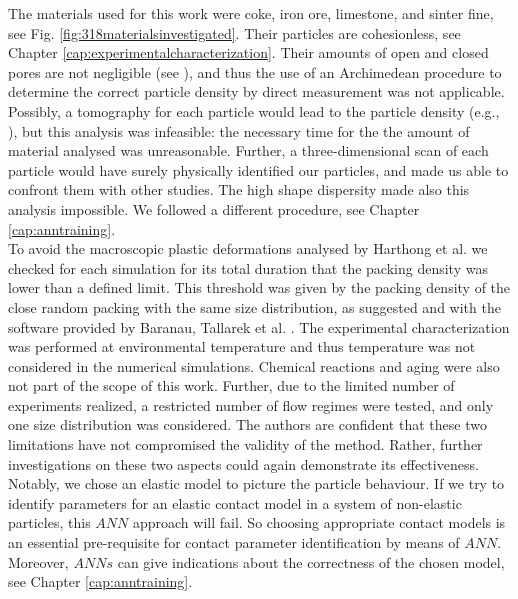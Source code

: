 The materials used for this work were coke, iron ore, limestone, and sinter
fine, see Fig. \ref{fig:318materialsinvestigated}. 
Their particles are
cohesionless, see Chapter \ref{cap:experimentalcharacterization}.
Their amounts of open and closed pores are not negligible (see
\citet{RefWorks:191}), 
and thus the use of an Archimedean procedure to determine the correct particle density by direct measurement
was not applicable.
Possibly, a tomography for each particle would lead to the particle density
(e.g., \citet{RefWorks:77}), but this analysis was infeasible: 
the necessary time for the the amount of material
analysed was unreasonable. 
Further, a three-dimensional scan of each particle would have surely physically
identified our particles, and made us able to confront them with other studies. 
The high shape dispersity made also this analysis impossible. 
We followed a different procedure, see Chapter \ref{cap:anntraining}.\\
To avoid the macroscopic plastic deformations analysed by Harthong et al. \cite{RefWorks:183} 
we checked for each simulation for its total duration that the packing density was 
lower than a defined limit. 
This threshold was given by the packing density of the close random packing with the 
same size distribution, as suggested and with the software provided by Baranau, Tallarek 
et al. \cite{RefWorks:182, RefWorks:185}.
The experimental characterization was performed at environmental temperature and thus 
temperature was not considered in the numerical simulations. Chemical reactions and aging 
were also not part of the scope of this work.
Further, due to the limited number of experiments realized, a restricted number
of flow regimes were tested, and only one size distribution was considered. 
The authors are confident that these two limitations have not compromised the validity of the method. 
Rather, further investigations on these two aspects could again demonstrate its effectiveness. 
Notably, we chose an elastic model to picture the particle behaviour. If we try
to identify parameters for an elastic contact model in a system of non-elastic particles, this $ANN$ approach will fail. 
So choosing appropriate contact models is an essential pre-requisite for contact 
parameter identification by means of $ANN$. 
Moreover, $ANNs$ can give indications about the correctness of the chosen model, 
see Chapter \ref{cap:anntraining}.